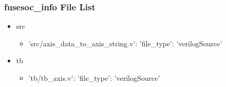 \subsubsection{fusesoc\_info File List}
\begin{itemize}
\item src
	\begin{itemize}
	\item {'src/axis\_data\_to\_axis\_string.v': {'file\_type': 'verilogSource'}}
	\end{itemize}
\item tb
	\begin{itemize}
	\item {'tb/tb\_axis.v': {'file\_type': 'verilogSource'}}
	\end{itemize}
\end{itemize}
